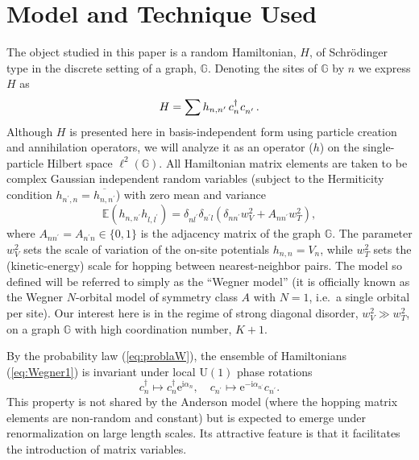 \documentclass[aps,prl,twocolumn,letterpaper,superscriptaddress]{revtex4-2}
\begin{document}
\section{Model and Technique Used}
The object studied in this paper is a random Hamiltonian, $H$, of Schr\"odinger type in the discrete setting of a graph, $\mathbb{G}$. Denoting the sites of $\mathbb{G}$ by $n$ we express $H$ as
\begin{equation}\label{eq:Wegner1}
    H = \sum h_{n,n^\prime} \, c_{n^{\vphantom{\prime}}}^\dagger c_{n^\prime}^{\vphantom{\dagger}} \,.
\end{equation}
Although $H$ is presented here in basis-independent form using particle creation and annihilation operators, we will analyze it as an operator ($h$) on the single-particle Hilbert space $\ell^2(\mathbb{G})$. All Hamiltonian matrix elements are taken to be complex Gaussian independent random variables (subject to the Hermiticity condition $h_{n^\prime,n} = \overline{h_{n,n^\prime}}$) with zero mean and variance
\begin{equation}\label{eq:problaW}
    \mathbb{E} \left( h_{n,n^\prime} h_{l,l^\prime} \right) = \delta_{n l^\prime} \delta_{n^\prime l} \left( \delta_{n n^\prime} w_V^2 + A_{n n^\prime} w_T^2 \right) ,
\end{equation}
where $A_{n n^\prime} = A_{n^\prime n} \in \{ 0 , 1 \}$ is the adjacency matrix of the graph $\mathbb{G}$. The parameter $w_V^2$ sets the scale of variation of the on-site potentials $h_{n,n} = V_n$, while $w_T^2$ sets the (kinetic-energy) scale for hopping between nearest-neighbor pairs. The model so defined will be referred to simply as the ``Wegner model'' (it is officially known as the Wegner $N$-orbital model of symmetry class $A$ with $N = 1$, i.e.\ a single orbital per site). Our interest here is in the regime of strong diagonal disorder, $w_V^2 \gg w_T^2$, on a graph $\mathbb{G}$ with high coordination number, $K+1$.

By the probability law (\ref{eq:problaW}), the ensemble of Hamiltonians (\ref{eq:Wegner1}) is invariant under local $\mathrm{U}(1)$ phase rotations
\begin{equation}
    c_n^\dagger \mapsto   c_n^\dagger \mathrm{e}^{\mathrm{i} \alpha_n} , \quad
    c_{n^\prime} \mapsto \mathrm{e}^{- \mathrm{i} \alpha_{n^\prime}}  c_{n^\prime}  .
\end{equation}
This property is not shared by the Anderson model (where the hopping matrix elements are non-random and constant) but is expected to emerge \cite{PS82} under renormalization on large length scales. Its attractive feature is that it facilitates the introduction of matrix variables.
\end{document}
